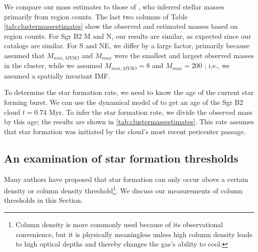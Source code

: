 \documentclass[twocolumn]{aastex61}
\begin{document}
We compare our mass estimates to those of \citet{Schmiedeke2016a}, who inferred
stellar masses primarily from \hii region counts.  The last two columns of Table
\ref{tab:clustermassestimates} show the observed and estimated masses based on
\hii region counts.  For Sgr B2 M and N, our results are similar, as expected
since our catalogs are similar.  For S and NE, we differ by a large factor,
primarily because \citet{Schmiedeke2016a} assumed that $M_{min,MYSO}$ and $M_{max}$
were the smallest and largest observed masses in the cluster, while we assumed
$M_{min,MYSO}=8$ \msun and $M_{max}=200$ \msun; i.e., we assumed a spatially
invariant IMF.



To determine the star formation rate, we need to know the age of the current
star forming burst.  We can use the dynamical model of \citet{Kruijssen2015a}
to get an age of the Sgr B2 cloud $t=0.74$ Myr.  To infer the star formation
rate, we divide the observed mass by this age; the results are shown in
\ref{tab:clustermassestimates}.  This rate assumes that star formation was
initiated by the cloud's most recent pericenter passage.


% 

\subsection{An examination of star formation thresholds}
Many authors \citep[e.g.,][]{Lada2010a} have proposed that star formation can
only occur above a certain density or column density threshold\footnote{Column
density is more commonly used because of its observational convenience, but it
is physically meaningless unless high column density leads to high optical
depths and thereby changes the gas's ability to cool.}. 
We discuss our measurements of column thresholds in this Section.
\end{document}

